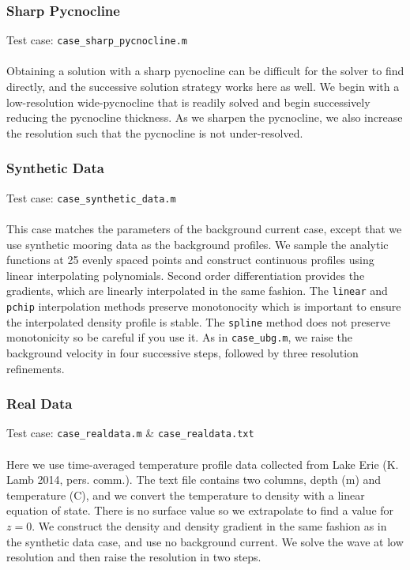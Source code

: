 \documentclass[letterpaper]{article}
\begin{document}
\subsubsection{Sharp Pycnocline}
Test case: \verb"case_sharp_pycnocline.m" \\\\
Obtaining a solution with a sharp pycnocline can be difficult for the solver to find directly, and the successive solution strategy works here as well.
We begin with a low-resolution wide-pycnocline that is readily solved and begin successively reducing the pycnocline thickness.
As we sharpen the pycnocline, we also increase the resolution such that the pycnocline is not under-resolved.

\subsubsection{Synthetic Data}
Test case: \verb"case_synthetic_data.m" \\\\
This case matches the parameters of the background current case, except that we use synthetic mooring data as the background profiles.
We sample the analytic functions at 25 evenly spaced points and construct continuous profiles using linear interpolating polynomials.
Second order differentiation provides the gradients, which are linearly interpolated in the same fashion.
The \verb+linear+ and \verb+pchip+ interpolation methods preserve monotonocity which is important to ensure the interpolated density profile is stable.
The \verb+spline+ method does not preserve monotonicity so be careful if you use it.
As in \verb"case_ubg.m", we raise the background velocity in four successive steps, followed by three resolution refinements.

\subsubsection{Real Data}
Test case: \verb"case_realdata.m" \&  \verb"case_realdata.txt" \\\\
Here we use time-averaged temperature profile data collected from Lake Erie (K. Lamb 2014, pers. comm.). 
The text file contains two columns, depth (m) and temperature (\textdegree C), and we convert the temperature to density with a linear equation of state.
There is no surface value so we extrapolate to find a value for $z=0$.
We construct the density and density gradient in the same fashion as in the synthetic data case, and use no background current.
We solve the wave at low resolution and then raise the resolution in two steps.



\end{document}
